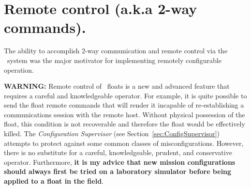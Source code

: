 %
%
%
%
%
%
%
%
%

\section{Remote control (a.k.a 2-way commands).}
\label{sec:RemoteControl}

The ability to accomplish 2-way communication and remote control via the
\iridium\ system was the major motivator for implementing remotely
configurable operation.

\textbf{WARNING:} Remote control of \iridium\ floats is a new and advanced
feature that requires a careful and knowledgeable operator.  For example, it
is quite possible to send the float remote commands that will render it
incapable of re-establishing a communications session with the remote host.
Without physical possession of the float, this condition is not recoverable
and therefore the float would be effectively killed.  The
\emph{Configuration Supervisor} (see Section~\ref{sec:ConfigSupervisor})
attempts to protect against some common classes of misconfigurations.
However, there is no substitute for a careful, knowledgeable, prudent, and
conservative operator.  Furthermore, \textbf{it is my advice that new
  mission configurations should always first be tried on a laboratory
  simulator before being applied to a float in the field}.

